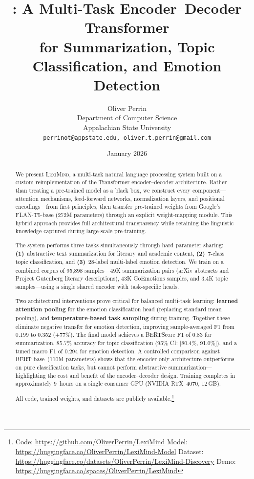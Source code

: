 \documentclass[11pt,a4paper]{article}
\title{\lexiname{}: A Multi-Task Encoder--Decoder Transformer\\
for Summarization, Topic Classification, and Emotion Detection}
\author{
  Oliver Perrin\\
  Department of Computer Science\\
  Appalachian State University\\
  \texttt{perrinot@appstate.edu, oliver.t.perrin@gmail.com}
}
\date{January 2026}
\newcommand{\lexiname}{\textsc{LexiMind}}
\newcommand{\tflant}{FLAN-T5}
\begin{document}
\maketitle

\begin{abstract}

\noindent We present \lexiname{}, a multi-task natural language processing system built on a custom reimplementation of the Transformer encoder--decoder architecture.
Rather than treating a pre-trained model as a black box, we construct every component---attention mechanisms, feed-forward networks, normalization layers, and positional encodings---from first principles, then transfer pre-trained weights from Google's \tflant{}-base (272M parameters) through an explicit weight-mapping module.
This hybrid approach provides full architectural transparency while retaining the linguistic knowledge captured during large-scale pre-training.

The system performs three tasks simultaneously through hard parameter sharing: \textbf{(1)}~abstractive text summarization for literary and academic content, \textbf{(2)}~7-class topic classification, and \textbf{(3)}~28-label multi-label emotion detection.
We train on a combined corpus of 95,898 samples---49K summarization pairs (arXiv abstracts and Project Gutenberg literary descriptions), 43K GoEmotions samples, and 3.4K topic samples---using a single shared encoder with task-specific heads.

Two architectural interventions prove critical for balanced multi-task learning: \textbf{learned attention pooling} for the emotion classification head (replacing standard mean pooling), and \textbf{temperature-based task sampling} during training.
Together these eliminate negative transfer for emotion detection, improving sample-averaged F1 from 0.199 to 0.352 (+77\%).
The final model achieves a BERTScore F1 of 0.83 for summarization, 85.7\% accuracy for topic classification (95\% CI: [80.4\%, 91.0\%]), and a tuned macro F1 of 0.294 for emotion detection.
A controlled comparison against BERT-base~(110M parameters) shows that the encoder-only architecture outperforms on pure classification tasks, but cannot perform abstractive summarization---highlighting the cost and benefit of the encoder--decoder design.
Training completes in approximately 9~hours on a single consumer GPU (NVIDIA RTX~4070, 12\,GB).

All code, trained weights, and datasets are publicly available.\footnote{Code: \url{https://github.com/OliverPerrin/LexiMind} \enspace Model: \url{https://huggingface.co/OliverPerrin/LexiMind-Model} \enspace Dataset: \url{https://huggingface.co/datasets/OliverPerrin/LexiMind-Discovery} \enspace Demo: \url{https://huggingface.co/spaces/OliverPerrin/LexiMind}}
\end{abstract}
\end{document}
